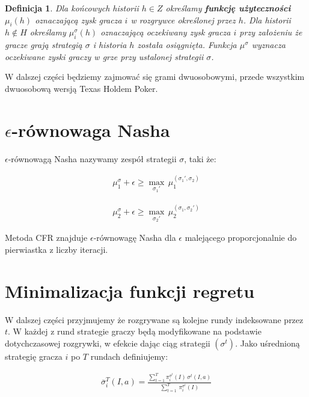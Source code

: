 \documentclass[licencjacka]{pracamgr}
\newtheorem{definition}[theorem]{Definicja}
\begin{document}
\begin{definition}
      Dla końcowych historii $h \in Z$ określamy \textbf{funkcję użyteczności} $\mu_i(h)$ oznaczającą zysk gracza $i$ w rozgrywce
      określonej przez $h$. Dla historii $h \notin H$ określamy $\mu_i^{\sigma}(h)$ oznaczającą oczekiwany zysk gracza $i$
      przy założeniu że gracze grają strategią $\sigma$ i historia $h$ została osiągnięta. Funkcja $\mu^{\sigma}$ wyznacza
      oczekiwane zyski graczy w grze przy ustalonej strategii $\sigma$.
\end{definition}


\noindent
W dalszej części będziemy zajmować się grami dwuosobowymi, przede wszystkim dwuosobową wersją Texas Holdem Poker.

\section{$\epsilon$-równowaga Nasha}

$\epsilon$-równowagą Nasha nazywamy zespół strategii $\sigma$, taki że:

\begin{align*}
\mu_1^{\sigma} + \epsilon \geq  \max_{\sigma_1'} \, \mu_1^{(\sigma_1', \sigma_2)} 
\end{align*}

\begin{align*}
\mu_2^{\sigma} + \epsilon \geq  \max_{\sigma_2'} \, \mu_2^{(\sigma_1, \sigma_2')} 
\end{align*}

\noindent
Metoda CFR znajduje $\epsilon$-równowagę Nasha dla $\epsilon$ malejącego proporcjonalnie do pierwiastka z liczby iteracji.

\section{Minimalizacja funkcji regretu}

W dalszej części przyjmujemy że rozgrywane są kolejne rundy indeksowane przez $t$. W każdej z rund
strategie graczy będą modyfikowane na podstawie dotychczasowej rozgrywki, w efekcie dając ciąg strategii
$(\sigma^t)$. Jako uśrednioną strategię gracza $i$ po $T$ rundach definiujemy:

\begin{align*}
\overline{\sigma}_i^T(I, a) = \frac{\sum\limits_{t=1}^T \pi_i^{\sigma^t}(I) \, \sigma^t(I, a)}{\sum\limits_{t=1}^T \, \pi_i^{\sigma^t}(I)}
\end{align*}
\end{document}
